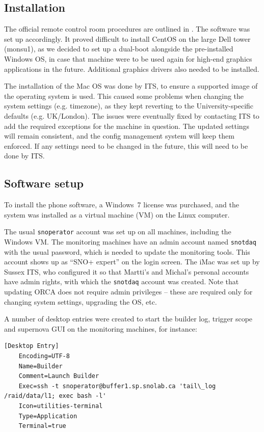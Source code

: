 \documentclass[a4paper,10pt]{article}
\begin{document}
\subsection{Installation}
The official remote control room procedures are outlined in \cite{doc4776}. The software was set up accordingly. It proved difficult to install CentOS on the large Dell tower (monsu1), as we decided to set up a dual-boot alongside the pre-installed Windows OS, in case that machine were to be used again for high-end graphics applications in the future. Additional graphics drivers also needed to be installed.

The installation of the Mac OS was done by ITS, to ensure a supported image of the operating system is used. This caused some problems when changing the system settings (e.g. timezone), as they kept reverting to the University-specific defaults (e.g. UK/London). The issues were eventually fixed by contacting ITS to add the required exceptions for the machine in question. The updated settings will remain consistent, and the config management system will keep them enforced. If any settings need to be changed in the future, this will need to be done by ITS.

\subsection{Software setup}
To install the phone software, a Windows~7 license was purchased, and the system was installed as a virtual machine (VM) on the Linux computer.

The usual {\tt snoperator} account was set up on all machines, including the Windows VM. The monitoring machines have an admin account named {\tt snotdaq} with the usual password, which is needed to update the monitoring tools. This account shows up as ``SNO+ expert'' on the login screen. The iMac was set up by Sussex ITS, who configured it so that Martti's and Michal's personal accounts have admin rights, with which the {\tt snotdaq} account was created. Note that updating ORCA does not require admin privileges -- these are required only for changing system settings, upgrading the OS, etc.

A number of desktop entries were created to start the builder log, trigger scope and supernova GUI on the monitoring machines, for instance:
{\small
\begin{Verbatim}[xleftmargin=-8mm]
	[Desktop Entry]
	Encoding=UTF-8
	Name=Builder
	Comment=Launch Builder
	Exec=ssh -t snoperator@buffer1.sp.snolab.ca 'tail\_log /raid/data/l1; exec bash -l'
	Icon=utilities-terminal
	Type=Application
	Terminal=true
\end{Verbatim}
}
\end{document}
